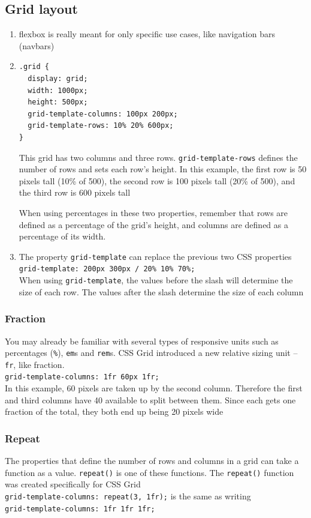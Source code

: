 \documentclass[a4paper, 12pt]{article}
\begin{document}
\subsection{Grid layout}
\begin{enumerate}
\item flexbox is really meant for only specific use cases, like navigation bars (navbars)

\item \begin{verbatim}
.grid {
  display: grid;
  width: 1000px;
  height: 500px;
  grid-template-columns: 100px 200px;
  grid-template-rows: 10% 20% 600px;
}
\end{verbatim}
This grid has two columns and three rows. \verb|grid-template-rows| defines the number of rows and sets each row's height. In this example, the first row is 50 pixels tall (10\% of 500), the second row is 100 pixels tall (20\% of 500), and the third row is 600 pixels tall

When using percentages in these two properties, remember that rows are defined as a percentage of the grid's height, and columns are defined as a percentage of its width.

\item The property \verb|grid-template| can replace the previous two CSS properties\\
\verb|grid-template: 200px 300px / 20% 10% 70%;|\\
When using \verb|grid-template|, the values before the slash will determine the size of each row. The values after the slash determine the size of each column

\end{enumerate}

\subsubsection{Fraction}
You may already be familiar with several types of responsive units such as percentages (\verb|%|), \verb|em|s and \verb|rem|s. CSS Grid introduced a new relative sizing unit -- \verb|fr|, like fraction.\\
\verb|grid-template-columns: 1fr 60px 1fr;|\\
In this example, 60 pixels are taken up by the second column. Therefore the first and third columns have 40 available to split between them. Since each gets one fraction of the total, they both end up being 20 pixels wide

\subsubsection{Repeat}
The properties that define the number of rows and columns in a grid can take a function as a value. \verb|repeat()| is one of these functions. The \verb|repeat()| function was created specifically for CSS Grid\\
\verb|grid-template-columns: repeat(3, 1fr);| is the same as writing\\ \verb|grid-template-columns: 1fr 1fr 1fr;|
\end{document}
